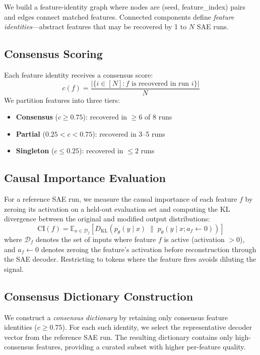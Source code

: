 \documentclass{article}
\newcommand{\kl}{\mathrm{KL}}
\begin{document}
We build a feature-identity graph where nodes are (seed, feature\_index) pairs and edges connect matched features. Connected components define \emph{feature identities}---abstract features that may be recovered by 1 to $N$ SAE runs.

\subsection{Consensus Scoring}

Each feature identity receives a consensus score:
\begin{equation}
    c(f) = \frac{|\{i \in [N] : f \text{ is recovered in run } i\}|}{N}
\end{equation}
We partition features into three tiers:
\begin{itemize}
    \item \textbf{Consensus} ($c \geq 0.75$): recovered in $\geq 6$ of 8 runs
    \item \textbf{Partial} ($0.25 < c < 0.75$): recovered in 3--5 runs
    \item \textbf{Singleton} ($c \leq 0.25$): recovered in $\leq 2$ runs
\end{itemize}

\subsection{Causal Importance Evaluation}

For a reference SAE run, we measure the causal importance of each feature $f$ by zeroing its activation on a held-out evaluation set and computing the KL divergence between the original and modified output distributions:
\begin{equation}
    \text{CI}(f) = \mathbb{E}_{x \in \mathcal{D}_f}\left[D_{\kl}\!\left(p_\theta(y \mid x) \;\|\; p_\theta(y \mid x; a_f \leftarrow 0)\right)\right]
\end{equation}
where $\mathcal{D}_f$ denotes the set of inputs where feature $f$ is active (activation $> 0$), and $a_f \leftarrow 0$ denotes zeroing the feature's activation before reconstruction through the SAE decoder. Restricting to tokens where the feature fires avoids diluting the signal.

\subsection{Consensus Dictionary Construction}

We construct a \emph{consensus dictionary} by retaining only consensus feature identities ($c \geq 0.75$). For each such identity, we select the representative decoder vector from the reference SAE run. The resulting dictionary contains only high-consensus features, providing a curated subset with higher per-feature quality.
\end{document}
